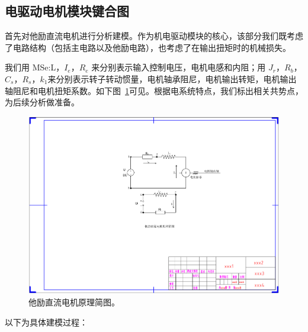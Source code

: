 \clearpage

\subsection{电驱动电机模块键合图}

首先对他励直流电机进行分析建模。作为机电驱动模块的核心，该部分我们既考虑了电路结构（包括主电路以及他励电路），也考虑了在输出扭矩时的机械损失。

我们用 MSe:L，$ I_e $，$ R_e $ 来分别表示输入控制电压，电机电感和内阻；用 $ J_r $，$ R_b $，$ C_s $，$ R_s $，$ k_1 $来分别表示转子转动惯量，电机轴承阻尼，电机输出转矩，电机输出轴阻尼和电机扭矩系数。如下图~\ref{fig:separately_excited_dc_motor}可见。根据电系统特点，我们标出相关共势点，为后续分析做准备。

\begin{figure}[!h]
	\centering
	\includegraphics[width=1.05\textwidth]{fig/separately_excited_dc_motor.pdf}
	\caption{他励直流电机原理简图。}\label{fig:separately_excited_dc_motor} %
\end{figure}

以下为具体建模过程：

